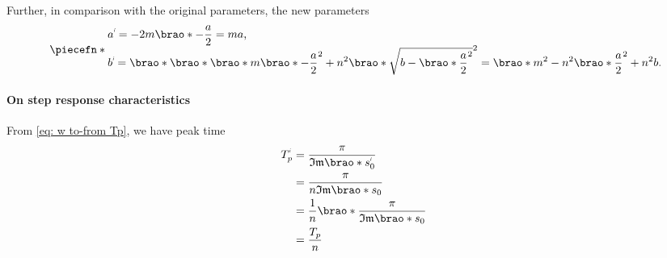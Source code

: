 \documentclass[12pt]{article}
\DeclarePairedDelimiter\brao()%
\DeclarePairedDelimiter\abs||
\DeclarePairedDelimiter\piecefn\{.
\newcommand{\setprime}[2][1]{%
    {#2}^{%
        \raisebox{1pt}{%
            \scalebox{0.5}{%
                \itshape\sffamily\uppercase%
                \expandafter{%
                    \romannumeral#1%
                }%
            }%
        }
    }%
}%
\begin{document}
\begin{enumerate}[(a)]
        Further, in comparison with the original parameters,
        the new parameters
        \begin{equation}
            \piecefn*{
                \begin{array}{@{}l@{}}\displaystyle
                      \setprime{a}
                    = -2m\brao*{-\frac{a}2}
                    = ma
                    \rlap,
                \\*\displaystyle
                      \setprime{b}
                    = \brao*{\brao*{\brao*m\brao*{-\frac{a}2}}^2 + n^2\brao*{\sqrt{b - \brao*{\frac{a}2}^2}}^2}
                    = \brao*{m^2 - n^2}\brao*{\frac{a}2}^2 + n^2 b
                    \rlap.
                \\*
                \end{array}
            }
        \end{equation}

        \paragraph{On step response characteristics}
        From \eqref{eq: w to-from Tp}, we have peak time
        \begin{equation}\label{eq:peak time, m, n}
            \begin{aligned}
                      \setprime{T}_p
                &{} = \frac\pi{\mathfrak{Im}\brao*{\setprime{s}_0}}
            \\*
                &{} = \frac\pi{n\mathfrak{Im}\brao*{s_0}}
            \\*
                &{} = \frac1n\brao*{\frac\pi{\mathfrak{Im}\brao*{s_0}}}
            \\*
                &{} = \frac{T_p}n
            \\*
            \end{aligned}
        \end{equation}


\end{enumerate}
\end{document}
